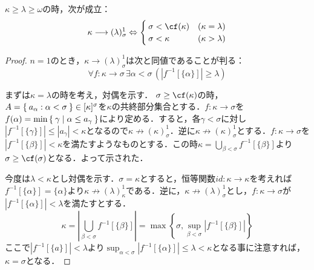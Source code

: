 \documentclass[a4paper]{bxjsarticle}
\begin{document}
\begin{lemma}\label{er:small}
 $\kappa \geq \lambda \geq \omega$の時，次が成立：
 \[
  \kappa \longrightarrow (\lambda)^1_\sigma
 \Leftrightarrow \begin{cases}
		  \sigma < \cf(\kappa) & (\kappa = \lambda)\\
		  \sigma < \kappa      & (\kappa > \lambda)
		 \end{cases}
 \]
\end{lemma}
\begin{proof}
 $n = 1$のとき，$\kappa \longrightarrow (\lambda)^1_\sigma$は次と同値であることが判る：
 \[
  \forall f : \kappa \rightarrow \sigma \, \exists \alpha < \sigma \, (|f^{-1}[\{\alpha\}]| \geq \lambda)
 \]
 
 まずは$\kappa = \lambda$の時を考え，対偶を示す．
 $\sigma \geq \cf(\kappa)$の時，$A = \Set{a_\alpha : \alpha < \sigma} \in [\kappa]^\sigma$を$\kappa$の共終部分集合とする．$f : \kappa \rightarrow \sigma$を$f(\alpha) = \min \Set{\gamma | \alpha \leq a_\gamma}$により定める．すると，各$\gamma < \sigma$に対し$|f^{-1}[\{\gamma\}]| \leq |a_\gamma| < \kappa$となるので$\kappa \nrightarrow (\kappa)^1_\sigma$．逆に$\kappa \nrightarrow (\kappa)^1_\sigma$とする．$f: \kappa \rightarrow \sigma$を$|f^{-1}[\{\beta\}]| < \kappa$を満たすようなものとする．この時$\kappa = \bigcup_{\beta < \sigma} f^{-1}[\{\beta\}]$より$\sigma \geq \cf(\sigma)$となる．よって示された．

 今度は$\lambda < \kappa$とし対偶を示す．$\sigma = \kappa$とすると，恒等関数$id: \kappa \rightarrow \kappa$を考えれば$f^{-1}[\{\alpha\}] = \{\alpha\}$より$\kappa \nrightarrow (\lambda)^1_\kappa$である．逆に，$\kappa \nrightarrow (\lambda)^1_\sigma$とし，$f : \kappa \rightarrow \sigma$が$|f^{-1}[\{\alpha\}]| < \lambda$を満たすとする．
 \[
  \kappa = \left|\bigcup_{\beta < \sigma} f^{-1}[\{\beta\}]\right| = \max\left\{ \sigma, \sup_{\beta < \sigma} \left|f^{-1}[\{\beta\}]\right| \right\}
 \]
 ここで$|f^{-1}[\{a\}]| < \lambda$より$\sup_{\alpha < \sigma} |f^{-1}[\{\alpha\}]| \leq \lambda < \kappa$となる事に注意すれば，$\kappa = \sigma$となる．\mbox{}
\end{proof}
\end{document}
